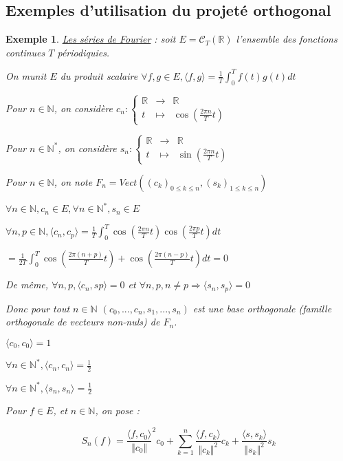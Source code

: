 \documentclass[a4paper,12pt]{book}
\newtheorem{Exe}{Exemple}[section]
\def\R{\mathbb{R}}
\def\N{\mathbb{N}}
\begin{document}
\subsection{Exemples d'utilisation du projeté orthogonal}
\begin{Exe}
\underline{Les séries de Fourier} : soit $E = \mathcal{C}_T(\R)$ l'ensemble des fonctions continues $T$ périodiquies.
\par On munit $E$ du produit scalaire $\forall f, g\in E, \langle f, g\rangle = \frac{1}{T}\int_0^Tf(t)g(t)dt$
\par Pour $n\in\N$, on considère $c_n:\left\{\begin{array}{rcl}\R & \to & \R \\ t & \mapsto & \cos\left(\frac{2\pi n}{T} t\right)\end{array}\right.$
\par Pour $n\in\N^*$, on considère $s_n:\left\{\begin{array}{rcl}\R & \to & \R \\ t & \mapsto & \sin\left(\frac{2\pi n}{T} t\right)\end{array}\right.$
\par Pour $n\in\N$, on note $F_n= Vect((c_k)_{0\leq k\leq n}, (s_k)_{1\leq k\leq n})$
\par $\forall n\in\N, c_n\in E, \forall n\in\N^*, s_n\in E$
\par $\forall n,p\in\N, \langle c_n,c_p\rangle  = \frac{1}{T}\int_0^T\cos\left(\frac{2\pi n}{T}t\right)\cos\left(\frac{2\pi p}{T}t\right)dt$
\par $ = \frac{1}{2T}\int_0^T\cos\left(\frac{2\pi (n+p)}{T}t\right) + \cos\left(\frac{2\pi (n-p)}{T}t\right)dt = 0$
\par De même, $\forall n,p, \langle c_n, sp\rangle = 0$ et $\forall n, p, n\neq p\Rightarrow \langle s_n, s_p\rangle = 0$
\par Donc pour tout $n\in\N$ $(c_0,..., c_n, s_1,..., s_n)$ est une base orthogonale (famille orthogonale de vecteurs non-nuls) de $F_n$.
\par $\langle c_0, c_0\rangle = 1$
\par $\forall n\in\N^*, \langle c_n, c_n\rangle = \frac{1}{2}$
\par $\forall n\in\N^*, \langle s_n, s_n\rangle = \frac{1}{2}$
\par Pour $f\in E$, et $n\in\N$, on pose :
\par $$S_n(f) = \frac{\langle f, c_0\rangle}{\Vert c_0\Vert}^2c_0 + \sum\limits_{k=1}^n\frac{\langle f, c_k\rangle}{\Vert c_k\Vert^2}c_k + \frac{\langle s, s_k\rangle}{\Vert s_k\Vert^2}s_k$$

\end{Exe}
\end{document}
